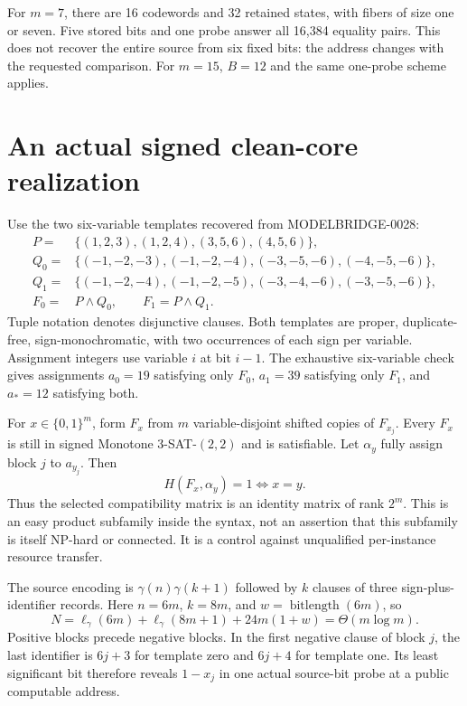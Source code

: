 \documentclass[11pt]{article}
\begin{document}
For $m=7$, there are 16 codewords and 32 retained states, with fibers of size
one or seven. Five stored bits and one probe answer all 16,384 equality
pairs. This does not recover the entire source from six fixed bits: the
address changes with the requested comparison. For $m=15$, $B=12$ and the
same one-probe scheme applies.

\section{An actual signed clean-core realization}
Use the two six-variable templates recovered from MODELBRIDGE-0028:
\begin{align*}
 P={}&\{(1,2,3),(1,2,4),(3,5,6),(4,5,6)\},\\
 Q_0={}&\{(-1,-2,-3),(-1,-2,-4),(-3,-5,-6),(-4,-5,-6)\},\\
 Q_1={}&\{(-1,-2,-4),(-1,-2,-5),(-3,-4,-6),(-3,-5,-6)\},\\
 F_0={}&P\land Q_0,\qquad F_1=P\land Q_1.
\end{align*}
Tuple notation denotes disjunctive clauses. Both templates are proper,
duplicate-free, sign-monochromatic, with two occurrences of each sign per
variable. Assignment integers use variable $i$ at bit $i-1$.
The exhaustive six-variable check gives assignments $a_0=19$ satisfying
only $F_0$, $a_1=39$ satisfying only $F_1$, and $a_*=12$ satisfying both.

For $x\in\{0,1\}^m$, form $F_x$ from $m$ variable-disjoint shifted copies
of $F_{x_j}$. Every $F_x$ is still in signed Monotone 3-SAT-$(2,2)$ and is
satisfiable. Let $\alpha_y$ fully assign block $j$ to $a_{y_j}$. Then
\[
 \boxed{H(F_x,\alpha_y)=1\iff x=y.}
 \tag{3}
\]
Thus the selected compatibility matrix is an identity matrix of rank $2^m$.
This is an easy product subfamily inside the syntax, not an assertion that
this subfamily is itself NP-hard or connected. It is a control against
unqualified per-instance resource transfer.

The source encoding is $\gamma(n)\gamma(k+1)$ followed by $k$ clauses of
three sign-plus-identifier records. Here $n=6m$, $k=8m$, and
$w=\operatorname{bitlength}(6m)$, so
\[
 N=\ell_\gamma(6m)+\ell_\gamma(8m+1)+24m(1+w)=\Theta(m\log m).
\]
Positive blocks precede negative blocks. In the first negative clause of
block $j$, the last identifier is $6j+3$ for template zero and $6j+4$ for
template one. Its least significant bit therefore reveals $1-x_j$ in one
actual source-bit probe at a public computable address.
\end{document}
